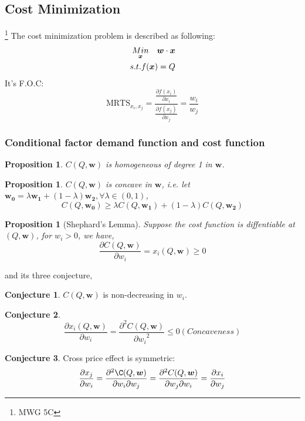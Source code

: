 \documentclass{article}
\theoremstyle{plain}
\newtheorem{prop}[thm]{Proposition}
\theoremstyle{definition}
\newtheorem{conj}{Conjecture}[section]
\theoremstyle{remark}
\begin{document}
\subsection{Cost Minimization}\footnote{MWG 5C }
The cost minimization problem is described as following:
\begin{align}\notag
\underset{\bm{x}}{Min} \quad \bm{w}\cdot \bm{x} \\ \notag
s.t. f(\bm{x}) = Q
\end{align}
It's F.O.C:
\begin{equation}
	\text{MRTS}_{x_i,x_j}=\frac{\frac{\partial f(x_i)}{\partial x_i}}{\frac{\partial f(x_j)}{\partial x_j}} = \frac{w_i}{w_j}
\end{equation}
\subsubsection{Conditional factor demand function and cost function}
\begin{prop}
$C(Q,\bm{w})$ is homogeneous of degree 1 in $\bm{w}$.
\end{prop}

\begin{prop}
$C(Q,\bm{w})$ is concave in $\bm{w}$, i.e. let $\bm{w_0} = \lambda \bm{w_1} + (1-\lambda)\bm{w_2}, \forall \lambda \in (0,1)$, 
\begin{equation}
	C(Q,\bm{w_0}) \geq \lambda C(Q,\bm{w_1}) + (1-\lambda)C(Q,\bm{w_2})
\end{equation}
\end{prop}

\begin{prop}[Shephard's Lemma]
Suppose the cost function is diffentiable at $(Q,\bm{w})$, for $w_i>0$, we have,
\begin{equation}
	\frac{\partial C(Q,\bm{w})}{\partial w_i} = x_i(Q,\bm{w})\geq 0
\end{equation}
\end{prop}
and its three conjecture,
\begin{conj}
$C(Q,\bm{w})$ is non-decreasing in $w_i$.
\end{conj}
\begin{conj}
\begin{equation}
	\frac{\partial x_i(Q,\bm{w})}{\partial w_i} = \frac{\partial^2 C(Q,\bm{w})}{{\partial w_i}^2}\leq 0 (Concaveness)
\end{equation}
\end{conj}
\begin{conj}
Cross price effect is symmetric: 
\begin{equation}
\frac{\partial x_j}{\partial w_i} = \frac{\partial^2\C(Q, \bm{w})} {\partial {w_i} \partial {w_j}}=\frac{\partial^2 C(Q, \bm{w})} {\partial w_j \partial w_i} = \frac{\partial {x_i}}{\partial {w_j}}
\end{equation}
\end{conj}
\end{document}
